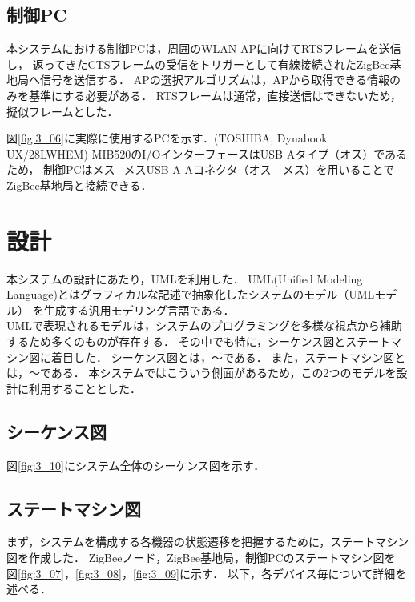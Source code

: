 \documentclass[12pt]{jreport}
\begin{document}
\subsection{制御PC}

本システムにおける制御PCは，周囲のWLAN APに向けてRTSフレームを送信し，
返ってきたCTSフレームの受信をトリガーとして有線接続されたZigBee基地局へ信号を送信する．
APの選択アルゴリズムは，APから取得できる情報のみを基準にする必要がある．
RTSフレームは通常，直接送信はできないため，擬似フレームとした．

図\ref{fig:3_06}に実際に使用するPCを示す．(TOSHIBA, Dynabook UX/28LWHEM)
MIB520のI/OインターフェースはUSB Aタイプ（オス）であるため，
制御PCはメス−メスUSB A-Aコネクタ（オス - メス）を用いることでZigBee基地局と接続できる．



\section{設計}
本システムの設計にあたり，UMLを利用した．
UML(Unified Modeling Language)とはグラフィカルな記述で抽象化したシステムのモデル（UMLモデル）
を生成する汎用モデリング言語である．\\
UMLで表現されるモデルは，システムのプログラミングを多様な視点から補助するため多くのものが存在する．
その中でも特に，シーケンス図とステートマシン図に着目した．
シーケンス図とは，〜である．
また，ステートマシン図とは，〜である．
本システムではこういう側面があるため，この2つのモデルを設計に利用することとした．

\subsection{シーケンス図}

図\ref{fig:3_10}にシステム全体のシーケンス図を示す．

\subsection{ステートマシン図}

まず，システムを構成する各機器の状態遷移を把握するために，ステートマシン図を作成した．
ZigBeeノード，ZigBee基地局，制御PCのステートマシン図を
図\ref{fig:3_07}，\ref{fig:3_08}，\ref{fig:3_09}に示す．
以下，各デバイス毎について詳細を述べる．
\end{document}
